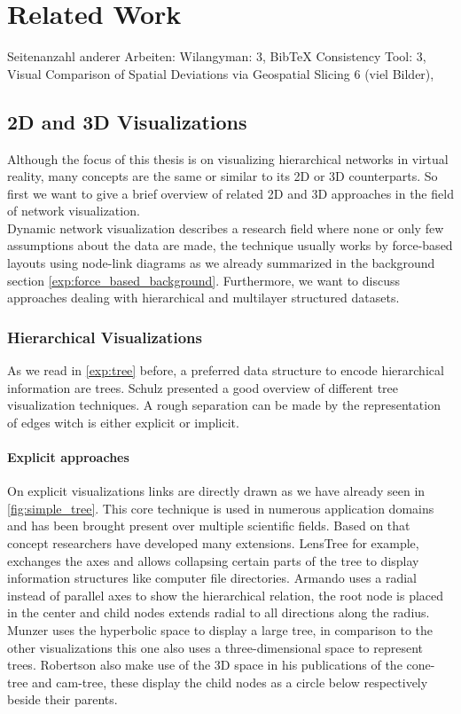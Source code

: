 \chapter{Related Work}
Seitenanzahl anderer Arbeiten: Wilangyman: 3, BibTeX Consistency Tool: 3, Visual Comparison of Spatial Deviations via Geospatial Slicing 6 (viel Bilder), 

\section{2D and 3D Visualizations}

Although the focus of this thesis is on visualizing hierarchical networks in virtual reality, many concepts are the same or similar to its 2D or 3D counterparts. So first we want to give a brief overview of related 2D and 3D approaches in the field of network visualization.\\
Dynamic network visualization describes a research field where none or only few assumptions about the data are made, the technique usually works by force-based layouts using node-link diagrams as we already summarized in the background section \ref{exp:force_based_background}. Furthermore, we want to discuss approaches dealing with hierarchical and multilayer structured datasets.

\subsection{Hierarchical Visualizations}

As we read in \ref{exp:tree} before, a preferred data structure to encode hierarchical information are trees.
Schulz \cite{schulz_treevisnet_2011} presented a good overview of different tree visualization techniques. A rough separation can be made by the representation of edges witch is either explicit or implicit. 

\subsubsection{Explicit approaches}
On explicit visualizations links are directly drawn as we have already seen in \ref{fig:simple_tree}. This core technique is used in numerous application domains and has been brought present over multiple scientific fields. Based on that concept researchers have developed many extensions.
LensTree \cite{song_lenstree_2006} for example, exchanges the axes and allows collapsing certain parts of the tree to display information structures like computer file directories. 
Armando \cite{arce-orozco_radial_2017} uses a radial instead of parallel axes to show the hierarchical relation, the root node is placed in the center and child nodes extends radial to all directions along the radius.
Munzer \cite{munzner_h3_1997} uses the hyperbolic space to display a large tree, in comparison to the other visualizations this one also uses a three-dimensional space to represent trees.
Robertson \cite{robertson_cone_1991} also make use of the 3D space in his publications of the cone-tree and cam-tree, these display the child nodes as a circle below respectively beside their parents.  

